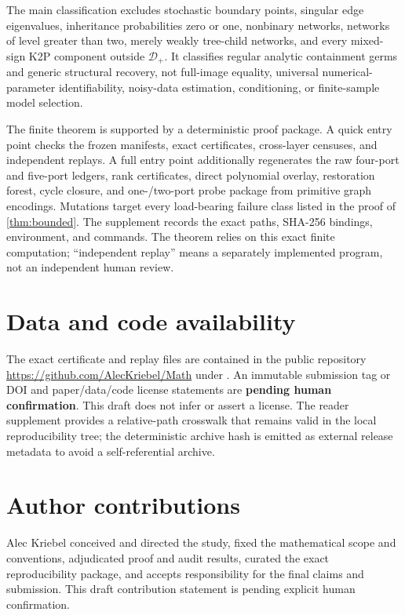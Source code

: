 \documentclass[11pt]{article}
\theoremstyle{remark}
\newcommand{\Dplus}{\mathcal D_+}
\newcommand{\1}{\mathbf 1}
\begin{document}
The main classification excludes stochastic boundary points, singular edge
eigenvalues, inheritance probabilities zero or one, nonbinary networks,
networks of level greater than two, merely weakly tree-child networks, and
every mixed-sign K2P component outside \(\Dplus\).  It classifies regular
analytic containment germs and generic structural recovery, not full-image
equality, universal numerical-parameter identifiability, noisy-data
estimation, conditioning, or finite-sample model selection.

The finite theorem is supported by a deterministic proof package.  A quick
entry point checks the frozen manifests, exact certificates, cross-layer
censuses, and independent replays.  A full entry point additionally regenerates
the raw four-port and five-port ledgers, rank certificates, direct polynomial
overlay, restoration forest, cycle closure, and one-/two-port probe package
from primitive graph encodings.  Mutations target every load-bearing failure
class listed in the proof of \cref{thm:bounded}.  The supplement records the
exact paths, SHA-256 bindings, environment, and commands.  The theorem relies
on this exact finite computation; ``independent replay'' means a separately
implemented program, not an independent human review.

\section*{Data and code availability}

The exact certificate and replay files are contained in the public repository
\url{https://github.com/AlecKriebel/Math} under
.  An immutable submission tag or
DOI and paper/data/code license statements are \textbf{pending human
confirmation}.  This draft does not infer or assert a license.  The reader
supplement provides a relative-path crosswalk that remains valid in the local
reproducibility tree; the deterministic archive hash is emitted as external
release metadata to avoid a self-referential archive.

\section*{Author contributions}

Alec Kriebel conceived and directed the study, fixed the mathematical scope
and conventions, adjudicated proof and audit results, curated the exact
reproducibility package, and accepts responsibility for the final claims and
submission.  This draft contribution statement is pending explicit human
confirmation.
\end{document}
